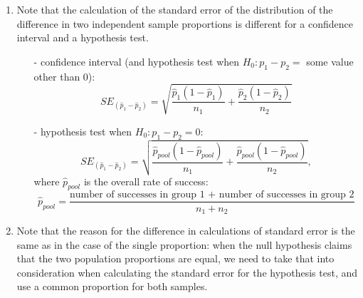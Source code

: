 \documentclass[11pt]{article}
\begin{document}
%
\begin{enumerate}[resume]
\renewcommand\labelenumi{\textcolor{light}{\textbf{LO \theenumi.}}}

\item Note that the calculation of the standard error of the distribution of the difference in two independent sample proportions is different for a confidence interval and a hypothesis test.
\begin{itemize}
\item[-] confidence interval (and hypothesis test when $H_0: p_1 -p_2 =$ some value other than 0): 
\[SE_{(\hat{p}_1 - \hat{p}_2)} = \sqrt{\frac{ \hat{p}_1 (1 - \hat{p}_1)}{n_1} + \frac{ \hat{p}_2 (1 - \hat{p}_2)}{n_2} } \]
\item[-] hypothesis test when $H_0: p_1 -p_2 = 0$: 
\[SE_{(\hat{p}_1 - \hat{p}_2)} = \sqrt{\frac{ \hat{p}_{pool} (1 - \hat{p}_{pool})}{n_1} + \frac{ \hat{p}_{pool} (1 - \hat{p}_{pool})}{n_2} }, \]
where $\hat{p}_{pool}$ is the overall rate of success:
\[ \hat{p}_{pool} = \frac{\text{number of successes in group 1 + number of successes in group 2}}{n_1 + n_2} \]
\end{itemize}

\item Note that the reason for the difference in calculations of standard error is the same as in the case of the single proportion: when the null hypothesis claims that the two population proportions are equal, we need to take that into consideration when calculating the standard error for the hypothesis test, and use a common proportion for both samples.

\end{enumerate}
\end{document}
